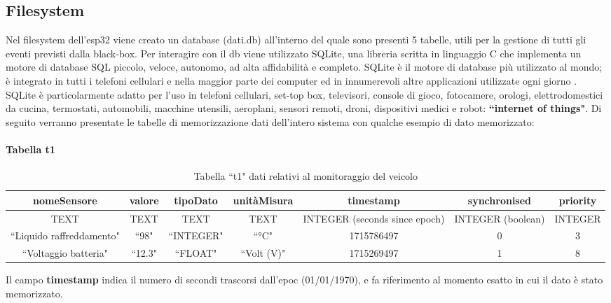 \documentclass[12pt, a4paper, italian]{report}
\numberwithin{figure}{chapter}
\numberwithin{table}{chapter}
\begin{document}
\subsection{Filesystem}
Nel filesystem dell'esp32 viene creato un database (dati.db) all'interno del quale sono presenti 5 tabelle, utili per la gestione di tutti gli eventi previsti dalla black-box. Per interagire con il db viene utilizzato SQLite, una libreria scritta in linguaggio C che implementa un motore di database SQL piccolo, veloce, autonomo, ad alta affidabilità e completo. SQLite è il motore di database più utilizzato al mondo; è integrato in tutti i telefoni cellulari e nella maggior parte dei computer ed in innumerevoli altre applicazioni utilizzate ogni giorno \cite{sqliteWhentoUse}. SQLite è particolarmente adatto per l'uso in telefoni cellulari, set-top box, televisori, console di gioco, fotocamere, orologi, elettrodomestici da cucina, termostati, automobili, macchine utensili, aeroplani, sensori remoti, droni, dispositivi medici e robot: \textbf{``internet of things"}.
Di seguito verranno presentate le tabelle di memorizzazione dati dell'intero sistema con qualche esempio di dato memorizzato:

\paragraph{Tabella t1}
\begin{table}[h!]
  \centering 
  \begin{adjustbox}{max width=\textwidth}
    \begin{tabular}{|c|c|c|c|c|c|c|}
      \hline
      \textbf{nomeSensore} & \textbf{valore} & \textbf{tipoDato} & \textbf{unitàMisura} & \textbf{timestamp} & \textbf{synchronised} & \textbf{priority} \\
      \hline
      TEXT & TEXT & TEXT & TEXT & INTEGER (seconds since epoch) & INTEGER (boolean) & INTEGER \\
      \hline
      ``Liquido raffreddamento" & ``98" & ``INTEGER" & ``°C" & 1715786497 & 0 & 3 \\
      \hline
      ``Voltaggio batteria" & ``12.3" & ``FLOAT" & ``Volt (V)" & 1715269497 & 1 & 8 \\
      \hline
    \end{tabular}
  \end{adjustbox}
  \caption{Tabella ``t1" dati relativi al monitoraggio del veicolo}
  \label{tab:t1 monitoraggio}
\end{table}
Il campo \textbf{timestamp} indica il numero di secondi trascorsi dall'epoc (01/01/1970), e fa riferimento al momento esatto in cui il dato è stato memorizzato.
\end{document}
